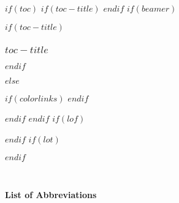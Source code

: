 $if(toc)$
$if(toc-title)$
\renewcommand*\contentsname{$toc-title$}
$endif$
$if(beamer)$
\begin{frame}[allowframebreaks]
$if(toc-title)$
  \frametitle{$toc-title$}
$endif$
  \tableofcontents[hideallsubsections]
\end{frame}
$else$
{
$if(colorlinks)$
\hypersetup{linkcolor=$if(toccolor)$$toccolor$$else$$endif$}
$endif$
\setcounter{tocdepth}{$toc-depth$}
\tableofcontents
}
$endif$
$endif$
$if(lof)$
\listoffigures
{}
$endif$
$if(lot)$
\listoftables
{}
$endif$

\clearpage
\newpage
\thispagestyle{empty} %
\mbox{~}
\clearpage
\newpage


\thispagestyle{plain} %

\begin{flushleft}
\huge\textbf{List of Abbreviations}
\end{flushleft}

\vspace*{\baselineskip}

